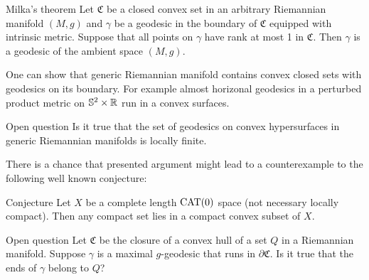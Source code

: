 \documentclass[a4paper,10pt]{article}
\begin{document}
\begin{thm}{Milka's theorem}
Let $\mathfrak{C}$ be a closed convex set in an arbitrary Riemannian manifold $(M,g)$ and $\gamma$ be a geodesic in the boundary of $\mathfrak{C}$ equipped with intrinsic metric.
Suppose that all points on $\gamma$ have rank at most 1 in $\mathfrak{C}$.
Then $\gamma$ is a geodesic of the ambient space $(M,g)$.
\end{thm}

One can show that generic Riemannian manifold contains convex closed sets with geodesics on its boundary.
For example almost horizonal geodesics in a perturbed product metric on $\mathbb{S}^2\times\mathbb{R}$ run in a convex surfaces.

\begin{thm}{Open question}
Is it true that the set of geodesics on convex hypersurfaces in generic Riemannian manifolds is locally finite.
\end{thm}

There is a chance that presented argument might lead to a counterexample to the following well known conjecture:

\begin{thm}{Conjecture}
Let $X$ be a complete length $\operatorname{\rm CAT}(0)$ space (not necessary locally compact).
Then any compact set lies in a compact convex subset of $X$.
\end{thm}

\begin{thm}{Open question}
Let $\mathfrak{C}$ be the closure of a convex hull of a set $Q$ in a Riemannian manifold.
Suppose $\gamma$ is a maximal $g$-geodesic that runs in $\partial \mathfrak{C}$.
Is it true that the ends of $\gamma$ belong to $Q$?
\end{thm}




\end{document}
